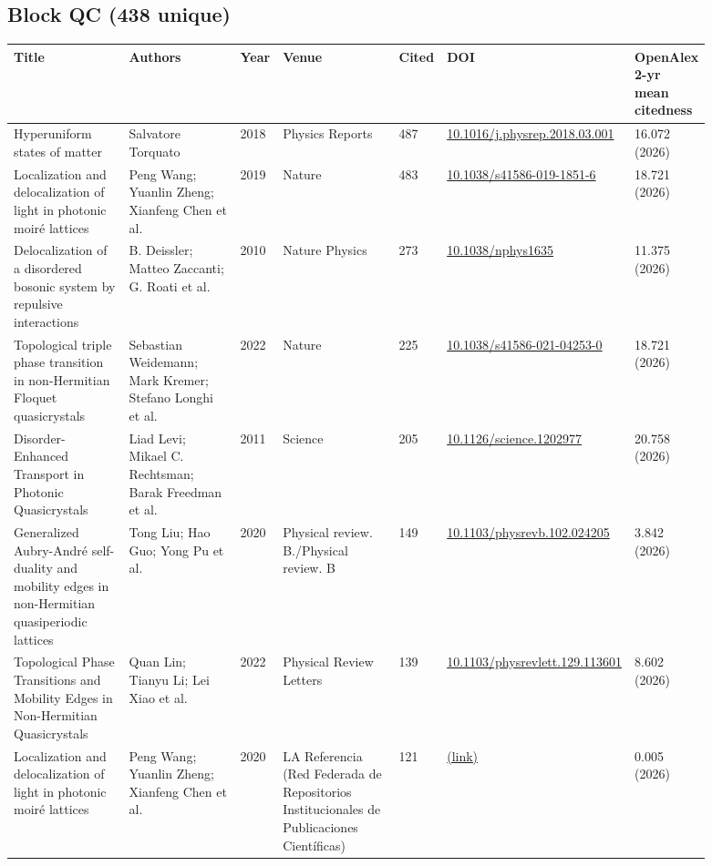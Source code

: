 \documentclass[10pt,a4paper]{article}
\begin{document}
\subsection*{Block QC (438 unique)}
{\scriptsize\begin{longtable}{p{0.192\linewidth}p{0.192\linewidth}p{0.043\linewidth}p{0.192\linewidth}p{0.043\linewidth}p{0.132\linewidth}p{0.096\linewidth}}
\hline
\textbf{Title} & \textbf{Authors} & \textbf{Year} & \textbf{Venue} & \textbf{Cited} & \textbf{DOI} & \textbf{OpenAlex 2-yr mean citedness} \\ \hline
\endhead
Hyperuniform states of matter & Salvatore Torquato & 2018 & Physics Reports & 487 & \href{https://doi.org/10.1016/j.physrep.2018.03.001}{10.1016/j.physrep.2018.03.001} & 16.072 (2026) \\
Localization and delocalization of light in photonic moiré lattices & Peng Wang; Yuanlin Zheng; Xianfeng Chen et al. & 2019 & Nature & 483 & \href{https://doi.org/10.1038/s41586-019-1851-6}{10.1038/s41586-019-1851-6} & 18.721 (2026) \\
Delocalization of a disordered bosonic system by repulsive interactions & B. Deissler; Matteo Zaccanti; G. Roati et al. & 2010 & Nature Physics & 273 & \href{https://doi.org/10.1038/nphys1635}{10.1038/nphys1635} & 11.375 (2026) \\
Topological triple phase transition in non-Hermitian Floquet quasicrystals & Sebastian Weidemann; Mark Kremer; Stefano Longhi et al. & 2022 & Nature & 225 & \href{https://doi.org/10.1038/s41586-021-04253-0}{10.1038/s41586-021-04253-0} & 18.721 (2026) \\
Disorder-Enhanced Transport in Photonic Quasicrystals & Liad Levi; Mikael C. Rechtsman; Barak Freedman et al. & 2011 & Science & 205 & \href{https://doi.org/10.1126/science.1202977}{10.1126/science.1202977} & 20.758 (2026) \\
Generalized Aubry-André self-duality and mobility edges in non-Hermitian quasiperiodic lattices & Tong Liu; Hao Guo; Yong Pu et al. & 2020 & Physical review. B./Physical review. B & 149 & \href{https://doi.org/10.1103/physrevb.102.024205}{10.1103/physrevb.102.024205} & 3.842 (2026) \\
Topological Phase Transitions and Mobility Edges in Non-Hermitian Quasicrystals & Quan Lin; Tianyu Li; Lei Xiao et al. & 2022 & Physical Review Letters & 139 & \href{https://doi.org/10.1103/physrevlett.129.113601}{10.1103/physrevlett.129.113601} & 8.602 (2026) \\
Localization and delocalization of light in photonic moiré lattices & Peng Wang; Yuanlin Zheng; Xianfeng Chen et al. & 2020 & LA Referencia (Red Federada de Repositorios Institucionales de Publicaciones Científicas) & 121 & \href{https://openalex.org/W3102201054}{(link)} & 0.005 (2026) \\

\end{longtable}}
\end{document}
